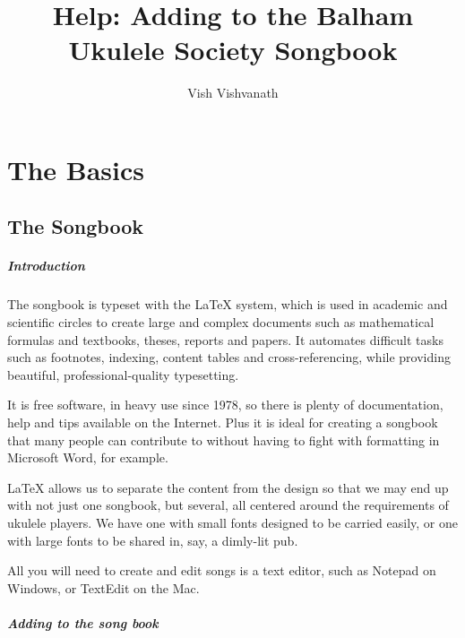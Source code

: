 \documentclass[16pt,a4paper,oneside]{book}
\title{Help: Adding to the Balham Ukulele Society Songbook}
\author{Vish Vishvanath}
\newcommand{\latex}{\LaTeX\xspace}
\begin{document}
\pagestyle{plain}
\maketitle
\restoregeometry

\dominitoc
\dominilof
\dominilot
\tableofcontents

\setcounter{page}{1}

\chapter{The Basics}\label{ch:the_basics}
\section{The Songbook} %
\label{sec:the_songbook}

\paragraph{Introduction} %
\label{par:introduction}

The songbook is typeset with the \latex system, which is used in academic and scientific circles to create large and complex documents such as mathematical formulas and textbooks, theses, reports and papers. It automates difficult tasks such as footnotes, indexing, content tables and cross-referencing, while providing beautiful, professional-quality typesetting.

It is free software, in heavy use since 1978, so there is plenty of documentation, help and tips available on the Internet. Plus it is ideal for creating a songbook that many people can contribute to without having to fight with formatting in Microsoft Word, for example.

\latex allows us to separate the content from the design so that we may end up with not just one songbook, but several, all centered around the requirements of ukulele players. We have one with small fonts designed to be carried easily, or one with large fonts to be shared in, say, a dimly-lit pub.

All you will need to create and edit songs is a text editor, such as Notepad on Windows, or TextEdit on the Mac.


\paragraph{Adding to the song book} %
\label{par:adding_to_the_song_book}
\end{document}
